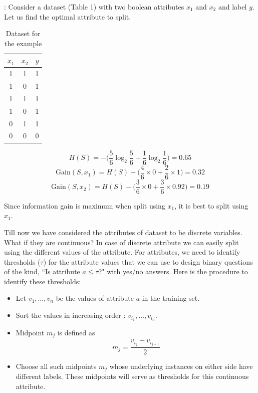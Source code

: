 : Consider a dataset (Table 1) with two boolean attributes $x_1$ and $x_2$ and label $y$. Let us find the optimal attribute to split.

\begin{table}[ht]
  \centering
  \begin{tabular}{|c|c|c|}
    \hline
    $x_1$ & $x_2$ & $y$ \\
    \hline
    1     & 1     & 1   \\
    \hline
    1     & 0     & 1   \\
    \hline
    1     & 1     & 1   \\
    \hline
    1     & 0     & 1   \\
    \hline
    0     & 1     & 1   \\
    \hline
    0     & 0     & 0   \\
    \hline
  \end{tabular}
  \caption{Dataset for the example}
\end{table}

$$
  H(S) = -\bigg(\frac{5}{6}\log_2 \frac{5}{6} + \frac{1}{6}\log_2 \frac{1}{6} \bigg) = 0.65
$$
$$
  \text{Gain}(S,x_1) = H(S) - \bigg( \frac{4}{6} \times 0 + \frac{2}{6}\times1\bigg) = 0.32
$$
$$
  \text{Gain}(S,x_2) = H(S) - \bigg( \frac{3}{6} \times 0 + \frac{3}{6}\times0.92\bigg) = 0.19
$$

Since information gain is maximum when split using $x_1$, it is best to split using $x_1$.
\vspace{8mm}

Till now we have considered the attributes of dataset to be discrete variables. What if they are continuous? In case of discrete attribute we can easily split using the different values of the attribute. For  attributes, we need to identify thresholds ($\tau$) for the attribute values that we can use to design binary questions of the kind, ``Is attribute $a \le \tau$?" with yes/no answers. Here is the procedure to identify these thresholds:
\begin{itemize}
  \item Let $v_1,\dots,v_n$ be the values of attribute $a$ in the training set.
  \item Sort the values in increasing order : $v_{i_1},\dots,v_{i_n}$.
  \item Midpoint $m_j$ is defined as
        $$m_j = \frac{v_{i_j} + v_{i_{j+1}}}{2}$$
  \item Choose all such midpoints $m_j$ whose underlying instances on either side have different labels. These midpoints will serve as thresholds for this continuous attribute.
\end{itemize}

